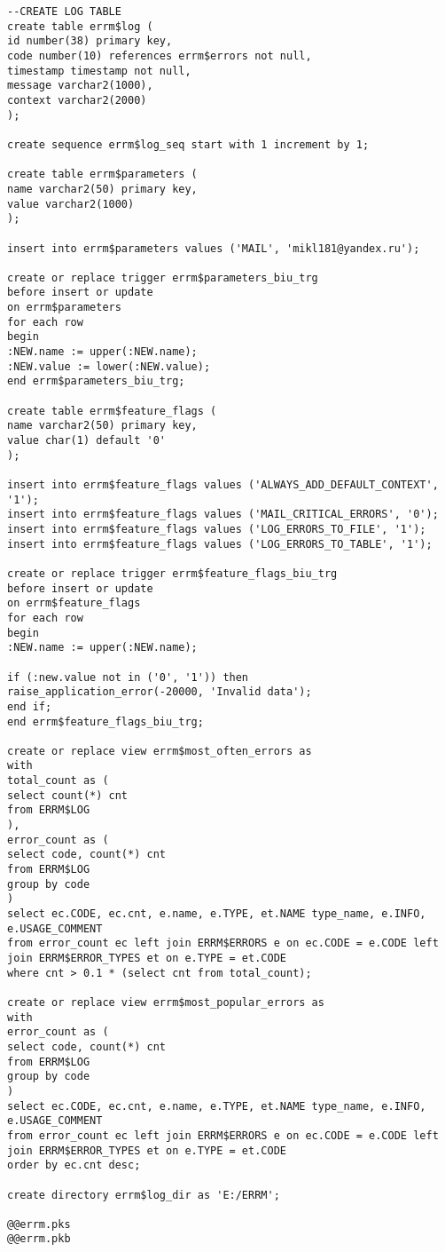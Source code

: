 \begin{verbatim}
--CREATE LOG TABLE
create table errm$log (
id number(38) primary key,
code number(10) references errm$errors not null,
timestamp timestamp not null,
message varchar2(1000),
context varchar2(2000)
);

create sequence errm$log_seq start with 1 increment by 1;

create table errm$parameters (
name varchar2(50) primary key,
value varchar2(1000)
);

insert into errm$parameters values ('MAIL', 'mikl181@yandex.ru');

create or replace trigger errm$parameters_biu_trg
before insert or update
on errm$parameters
for each row
begin
:NEW.name := upper(:NEW.name);
:NEW.value := lower(:NEW.value);
end errm$parameters_biu_trg;

create table errm$feature_flags (
name varchar2(50) primary key,
value char(1) default '0'
);

insert into errm$feature_flags values ('ALWAYS_ADD_DEFAULT_CONTEXT', '1');
insert into errm$feature_flags values ('MAIL_CRITICAL_ERRORS', '0');
insert into errm$feature_flags values ('LOG_ERRORS_TO_FILE', '1');
insert into errm$feature_flags values ('LOG_ERRORS_TO_TABLE', '1');

create or replace trigger errm$feature_flags_biu_trg
before insert or update
on errm$feature_flags
for each row
begin
:NEW.name := upper(:NEW.name);

if (:new.value not in ('0', '1')) then
raise_application_error(-20000, 'Invalid data');
end if;
end errm$feature_flags_biu_trg;

create or replace view errm$most_often_errors as
with
total_count as (
select count(*) cnt
from ERRM$LOG
),
error_count as (
select code, count(*) cnt
from ERRM$LOG
group by code
)
select ec.CODE, ec.cnt, e.name, e.TYPE, et.NAME type_name, e.INFO, e.USAGE_COMMENT
from error_count ec left join ERRM$ERRORS e on ec.CODE = e.CODE left join ERRM$ERROR_TYPES et on e.TYPE = et.CODE
where cnt > 0.1 * (select cnt from total_count);

create or replace view errm$most_popular_errors as
with
error_count as (
select code, count(*) cnt
from ERRM$LOG
group by code
)
select ec.CODE, ec.cnt, e.name, e.TYPE, et.NAME type_name, e.INFO, e.USAGE_COMMENT
from error_count ec left join ERRM$ERRORS e on ec.CODE = e.CODE left join ERRM$ERROR_TYPES et on e.TYPE = et.CODE
order by ec.cnt desc;

create directory errm$log_dir as 'E:/ERRM';

@@errm.pks
@@errm.pkb
\end{verbatim}


